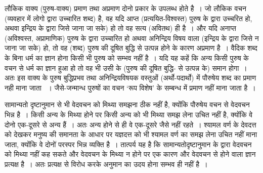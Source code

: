 लौकिक वाक्य (पुरुष-वाक्य) प्रमाण तथा अप्रमाण दोनो प्रकार के उपलब्ध होते है~। जो लौकिक वचन (व्यवहार में लोगो द्वारा उच्चारित शब्द) है, वह यदि आप्त (प्रत्ययित-विश्वस्त) पुरुष के द्वारा उच्चरित हो, अथवा इन्द्रिय के द्वारा जिसे जाना जा सके) हो तो वह सत्य (अवितथ) ही है~। और यदि अनाप्त (अविश्वस्त, अप्रामाणिक) पुरुष के द्वारा उच्चारित हो अथवा अनिन्द्रिय विषय वाला (इन्द्रिय के द्वारा जिसे न जाना जा सके) हो, तो वह (शब्द) पुरुष की दूषित बुद्धि से उत्पन्न होने के कारण अप्रमाण है~। वैदिक शब्द के बिना धर्म का ज्ञान होना किसी भी पुरुष को सम्भव नहीं है~। यदि यह कहें कि अन्य किसी पुरुष के वचन से धर्म का ज्ञान हुआ हो तो वह भी उसी के (पुरुष की दूषित बुद्धि- से उत्पन्न के) समान होगा~। अतः इस वाक्य के पुरुष बुद्धिप्रभव तथा अनिन्द्रियविषयक वस्तुओं (अर्थो-पदार्थो) में पौरुषेय शब्द का प्रमाण नही माना जाता ~। जैसे-जन्मान्ध पुरुषों का वचन ‘रूप विशेष' के सम्बन्ध में प्रमाण नहीं माना जाता है~।

सामान्यतो दृष्टानुमान से भी वेदवचन को मिथ्या समझना ठीक नहीं है, क्योंकि पौरुषेय वचन से वेदवचन भिन्न है~। किसी अन्य के मिथ्या होने पर किसी अन्य को भी मिथ्या समझ लेना उचित नहीं है, क्योंकि वे दोनो एक-दूसरे से अन्य हैं~। अतः अन्य होने से ही वे एक-दूसरे जैसे नहीं रहते~। श्यामल वर्ण के देवदत्त को देखकर मनुष्य की समानता के आधार पर यज्ञदत्त को भी श्यामल वर्ण का समझ लेना उचित नहीं माना जाता, क्योंकि वे दोनो॑ परस्पर भिन्न व्यक्ति है~। तात्पर्य यह है कि सामान्यतोदृष्टानुमान के द्वारा वेदवचन को मिथ्या नहीं कह सकते और वेदवचन के मिथ्या न होने पर एक कारण और वेदवचन से होने वाला ज्ञान प्रत्यक्ष है~। अतः प्रत्यक्ष से विरोध करके अनुमान का उदय होना सम्भव ही नहीं है~।

